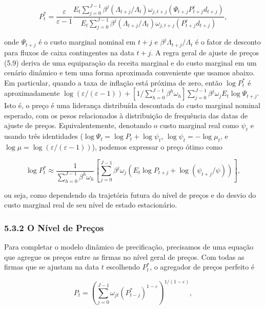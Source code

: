\documentclass[12pt]{article}
\begin{document}
\begin{equation}
P_t^* = \frac{\varepsilon}{\varepsilon-1} \frac{E_t \sum_{j=0}^{J-1} \beta^j (\Lambda_{t+j}/\Lambda_t) \omega_{j, t+j} (\Psi_{t+j} P_{t+j}^{\varepsilon} d_{t+j})}{E_t \sum_{j=0}^{J-1} \beta^j (\Lambda_{t+j}/\Lambda_t) \omega_{j, t+j} (P_{t+j}^{\varepsilon} d_{t+j})}, \tag{5.9}
\end{equation}

onde $\Psi_{t+j}$ é o custo marginal nominal em $t+j$ e $\beta^j \Lambda_{t+j}/\Lambda_t$ é o fator de desconto para fluxos de caixa contingentes na data $t+j$. A regra geral de ajuste de preços (5.9) deriva de uma equiparação da receita marginal e do custo marginal em um cenário dinâmico e tem uma forma aproximada conveniente que usamos abaixo. Em particular, quando a taxa de inflação está próxima de zero, então $\log P_t^*$ é aproximadamente $\log(\varepsilon/(\varepsilon-1)) + [1/\sum_{h=0}^{J-1} \beta^h \omega_h] \sum_{j=0}^{J-1} \beta^j \omega_j E_t \log \Psi_{t+j}$. Isto é, o preço é uma liderança distribuída descontada do custo marginal nominal esperado, com os pesos relacionados à distribuição de frequência das datas de ajuste de preços. Equivalentemente, denotando o custo marginal real como $\psi_t$ e usando três identidades ($\log \Psi_t = \log P_t + \log \psi_t$, $\log \psi_t = -\log \mu_t$, e $\log \mu = \log(\varepsilon/(\varepsilon-1))$), podemos expressar o preço ótimo como

\begin{equation}
\log P_t^* \approx \frac{1}{\sum_{h=0}^{J-1} \beta^h \omega_h} [ \sum_{j=0}^{J-1} \beta^j \omega_j (E_t \log P_{t+j} + \log (\psi_{t+j}/\psi)) ], \tag{5.10}
\end{equation}

ou seja, como dependendo da trajetória futura do nível de preços e do desvio do custo marginal real de seu nível de estado estacionário.

\subsubsection{5.3.2 O Nível de Preços} Para completar o modelo dinâmico de precificação, precisamos de uma equação que agregue os preços entre as firmas no nível geral de preços. Com todas as firmas que se ajustam na data $t$ escolhendo $P_t^*$, o agregador de preços perfeito é

\begin{equation}
P_t = \left( \sum_{j=0}^{J-1} \omega_{jt} (P_{t-j}^*)^{1-\varepsilon} \right)^{1/(1-\varepsilon)}, \tag{5.11}
\end{equation}
\end{document}
